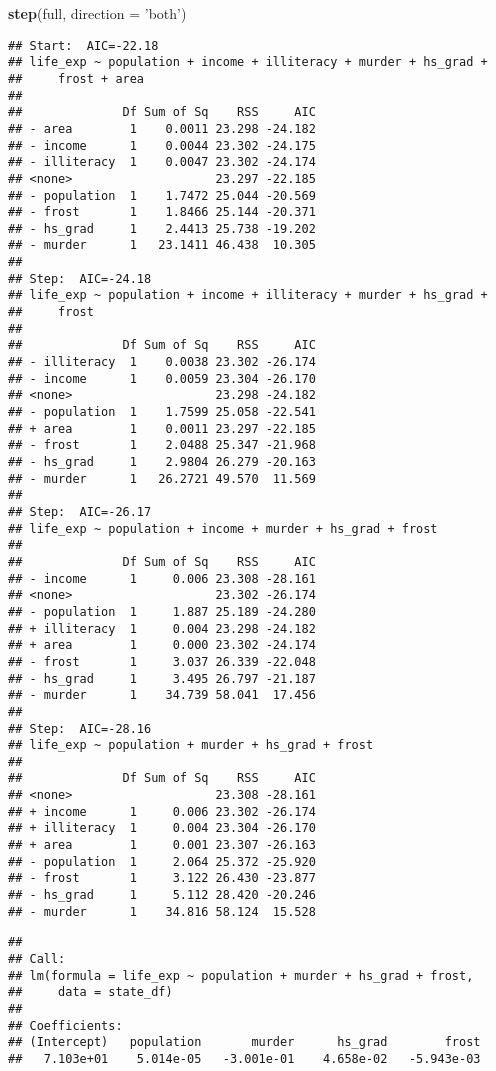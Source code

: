 \documentclass[]{article}
\newenvironment{Shaded}{\begin{snugshade}}{\end{snugshade}}
\newcommand{\DataTypeTok}[1]{\textcolor[rgb]{0.13,0.29,0.53}{#1}}
\newcommand{\KeywordTok}[1]{\textcolor[rgb]{0.13,0.29,0.53}{\textbf{#1}}}
\newcommand{\NormalTok}[1]{#1}
\newcommand{\StringTok}[1]{\textcolor[rgb]{0.31,0.60,0.02}{#1}}
\begin{document}
\begin{Shaded}
\begin{Highlighting}[]
\KeywordTok{step}\NormalTok{(full, }\DataTypeTok{direction =} \StringTok{'both'}\NormalTok{)}
\end{Highlighting}
\end{Shaded}

\begin{verbatim}
## Start:  AIC=-22.18
## life_exp ~ population + income + illiteracy + murder + hs_grad + 
##     frost + area
## 
##              Df Sum of Sq    RSS     AIC
## - area        1    0.0011 23.298 -24.182
## - income      1    0.0044 23.302 -24.175
## - illiteracy  1    0.0047 23.302 -24.174
## <none>                    23.297 -22.185
## - population  1    1.7472 25.044 -20.569
## - frost       1    1.8466 25.144 -20.371
## - hs_grad     1    2.4413 25.738 -19.202
## - murder      1   23.1411 46.438  10.305
## 
## Step:  AIC=-24.18
## life_exp ~ population + income + illiteracy + murder + hs_grad + 
##     frost
## 
##              Df Sum of Sq    RSS     AIC
## - illiteracy  1    0.0038 23.302 -26.174
## - income      1    0.0059 23.304 -26.170
## <none>                    23.298 -24.182
## - population  1    1.7599 25.058 -22.541
## + area        1    0.0011 23.297 -22.185
## - frost       1    2.0488 25.347 -21.968
## - hs_grad     1    2.9804 26.279 -20.163
## - murder      1   26.2721 49.570  11.569
## 
## Step:  AIC=-26.17
## life_exp ~ population + income + murder + hs_grad + frost
## 
##              Df Sum of Sq    RSS     AIC
## - income      1     0.006 23.308 -28.161
## <none>                    23.302 -26.174
## - population  1     1.887 25.189 -24.280
## + illiteracy  1     0.004 23.298 -24.182
## + area        1     0.000 23.302 -24.174
## - frost       1     3.037 26.339 -22.048
## - hs_grad     1     3.495 26.797 -21.187
## - murder      1    34.739 58.041  17.456
## 
## Step:  AIC=-28.16
## life_exp ~ population + murder + hs_grad + frost
## 
##              Df Sum of Sq    RSS     AIC
## <none>                    23.308 -28.161
## + income      1     0.006 23.302 -26.174
## + illiteracy  1     0.004 23.304 -26.170
## + area        1     0.001 23.307 -26.163
## - population  1     2.064 25.372 -25.920
## - frost       1     3.122 26.430 -23.877
## - hs_grad     1     5.112 28.420 -20.246
## - murder      1    34.816 58.124  15.528
\end{verbatim}

\begin{verbatim}
## 
## Call:
## lm(formula = life_exp ~ population + murder + hs_grad + frost, 
##     data = state_df)
## 
## Coefficients:
## (Intercept)   population       murder      hs_grad        frost  
##   7.103e+01    5.014e-05   -3.001e-01    4.658e-02   -5.943e-03
\end{verbatim}
\end{document}
